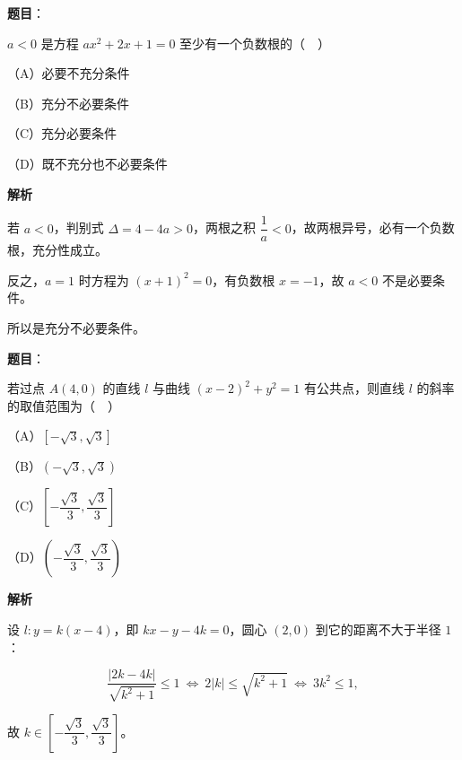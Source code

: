 \begin{answer}

\textbf{题目}：

$a<0$ 是方程 $ax^2+2x+1=0$ 至少有一个负数根的（　）

（A）必要不充分条件

（B）充分不必要条件

（C）充分必要条件

（D）既不充分也不必要条件

\textbf{解析}

若 $a<0$，判别式 $\Delta=4-4a>0$，两根之积 $\dfrac1a<0$，故两根异号，必有一个负数根，充分性成立。

反之，$a=1$ 时方程为 $(x+1)^2=0$，有负数根 $x=-1$，故 $a<0$ 不是必要条件。

所以是充分不必要条件。


\end{answer}
\begin{answer}

\textbf{题目}：

若过点 $A(4,0)$ 的直线 $l$ 与曲线 $(x-2)^2+y^2=1$ 有公共点，则直线 $l$ 的斜率的取值范围为（　）

（A）$[-\sqrt3,\sqrt3]$

（B）$(-\sqrt3,\sqrt3)$

（C）$\left[-\dfrac{\sqrt3}{3},\dfrac{\sqrt3}{3}\right]$

（D）$\left(-\dfrac{\sqrt3}{3},\dfrac{\sqrt3}{3}\right)$

\textbf{解析}

设 $l:y=k(x-4)$，即 $kx-y-4k=0$，圆心 $(2,0)$ 到它的距离不大于半径 $1$：

\nopagebreak[4]
\[\frac{|2k-4k|}{\sqrt{k^2+1}}\leqslant1\ \Longleftrightarrow\ 2|k|\leqslant\sqrt{k^2+1}\ \Longleftrightarrow\ 3k^2\leqslant1,\]

故 $k\in\left[-\dfrac{\sqrt3}3,\dfrac{\sqrt3}3\right]$。


\end{answer}
